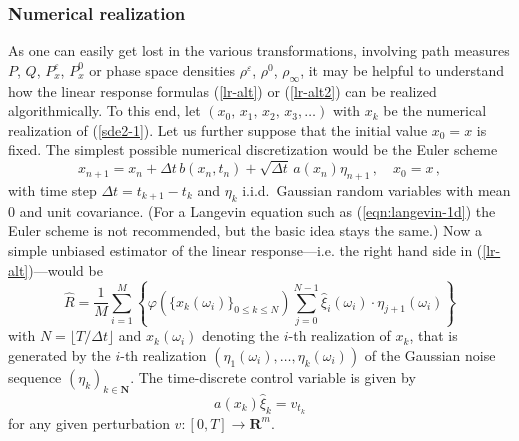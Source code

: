 \documentclass[]{tMPH2e}
\newcommand{\R}{{\mathbf R}}
\newcommand{\N}{{\mathbf N}}
\newcommand{\eps}{\varepsilon}
\begin{document}
\subsubsection*{Numerical realization}

As one can easily get lost in the various transformations, involving path measures $P$, $Q$, $P_{x}^{\eps}$, $P^{0}_{x}$ or phase space densities $\rho^{\eps}$, $\rho^{0}$, $\rho_{\infty}$, it may be helpful to understand how the linear response formulas (\ref{lr-alt}) or (\ref{lr-alt2}) can be realized algorithmically. To this end, let $(x_0,\,x_{1},\,x_{2},\,x_{3},\ldots)$ with $x_{k}$ be the numerical realization of (\ref{sde2-1}). Let us further suppose that the initial value $x_{0}=x$ is fixed. The simplest possible numerical discretization would be the Euler scheme 
\[
x_{n+1} = x_{n} + \Delta t\, b(x_{n},t_{n}) + \sqrt{\Delta t}\,a(x_{n})\eta_{n+1}\,,\quad x_{0}=x\,, 
\]
with time step $\Delta t=t_{k+1}-t_{k}$ and $\eta_{k}$ i.i.d.~Gaussian random variables with mean 0 and unit covariance. (For a Langevin equation such as (\ref{eqn:langevin-1d}) the Euler scheme is not recommended, but the basic idea stays the same.) Now a simple unbiased estimator of the linear response---i.e. the right hand side in (\ref{lr-alt})---would be 
\begin{equation}\label{lr-est}
\hat{R} = \frac{1}{M}\sum_{i=1}^{M}\left\{\varphi(\{x_{k}(\omega_{i})\}_{0\le k\le N})\sum_{j=0}^{N-1}\hat{\xi}_{i}(\omega_{i})\cdot \eta_{j+1}(\omega_{i})\right\}
\end{equation}
with $N=\lfloor T/\Delta t\rfloor$ and $x_{k}(\omega_{i})$ denoting the $i$-th realization of $x_{k}$, that is generated by the $i$-th realization $(\eta_{1}(\omega_{i}),\ldots,\eta_{k}(\omega_{i}))$ of the Gaussian noise sequence $(\eta_{k})_{k\in\N}$. The time-discrete control variable is given by  
\[
a(x_{k})\hat{\xi}_{k} = v_{t_{k}}
\]
for any given perturbation $v\colon[0,T]\to\R^{m}$. 
\end{document}
